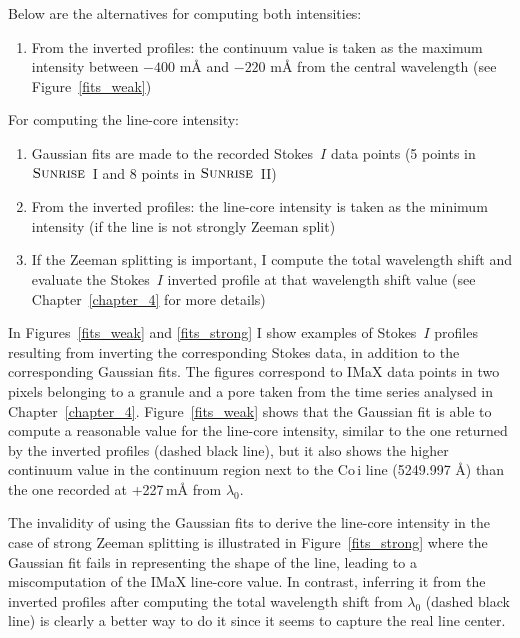 \documentclass[goettingen, gauss, print]{thesis}
\begin{document}
Below are the alternatives for computing both intensities:
\begin{enumerate}
\item From the inverted profiles: the continuum value is taken as the maximum intensity between $-400$ m\AA{} and $-220$ m\AA{} from the central wavelength (see Figure~\ref{fits_weak})
\end{enumerate}
For computing the line-core intensity:
\begin{enumerate}
\item Gaussian fits are made to the recorded Stokes~$I$ data points (5 points in $\textsc{Sunrise}$~I and 8 points in $\textsc{Sunrise}$~II)

\item From the inverted profiles: the line-core intensity is taken as the minimum intensity (if the line is not strongly Zeeman split)

\item If the Zeeman splitting is important, I compute the total wavelength shift and evaluate the Stokes~$I$ inverted profile at that wavelength shift value (see Chapter~\ref{chapter_4} for more details)
\end{enumerate}

In Figures~\ref{fits_weak} and \ref{fits_strong} I show examples of Stokes~$I$ profiles resulting from inverting the corresponding Stokes data, in addition to the corresponding Gaussian fits. The figures correspond to IMaX data points in two pixels belonging to a granule and a pore taken from the time series analysed in Chapter~\ref{chapter_4}.
Figure~\ref{fits_weak} shows that the Gaussian fit is able to compute a reasonable value for the line-core intensity, similar to the one returned by the inverted profiles (dashed black line), but it also shows the higher continuum value in the continuum region next to the Co\,{\sc i} line (5249.997 \AA{}) than the one recorded at +227\,m\AA{} from $\lambda_0$.

The invalidity of using the Gaussian fits to derive the line-core intensity in the case of strong Zeeman splitting is illustrated in Figure~\ref{fits_strong} where the Gaussian fit fails in representing the shape of the line, leading to a miscomputation of the IMaX line-core value. In contrast, inferring it from the inverted profiles after computing the total wavelength shift from $\lambda_0$ (dashed black line) is clearly a better way to do it since it seems to capture the real line center.
\end{document}
